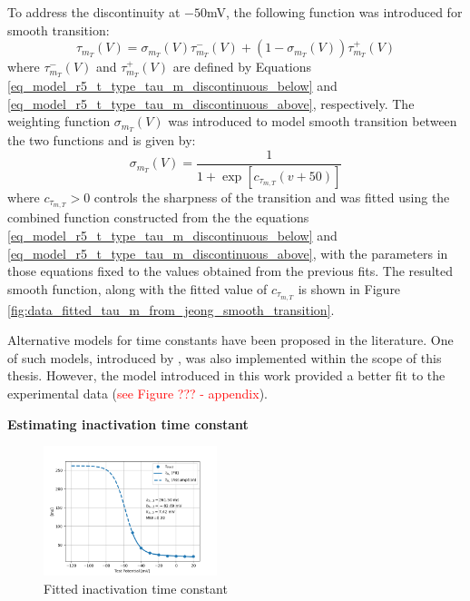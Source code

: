 \documentclass[../main.tex]{subfiles}
\begin{document}
To address the discontinuity at $-50$mV, the following function was introduced for smooth transition:
\begin{equation}\label{eq_model_r5_t_type_tau_m}
    \tau_{m_T}(V) = \sigma_{m_T}(V) \tau_{m_T}^-(V) + (1 - \sigma_{m_T}(V))\tau_{m_T}^+(V)
\end{equation}
where $\tau_{m_T}^-(V)$ and $\tau_{m_T}^+(V)$ are defined by Equations \ref{eq_model_r5_t_type_tau_m_discontinuous_below} and \ref{eq_model_r5_t_type_tau_m_discontinuous_above}, respectively. The weighting function $\sigma_{m_T}(V)$ was introduced to model smooth transition between the two functions and is given by:
\begin{equation}\label{eq_model_r5_t_type_channel_tau_m_sigma}
    \sigma_{m_T}(V) = \frac{1}{1 + \exp{[ c_{\tau_{m,T}} (v + 50) ]}}
\end{equation}
where $c_{\tau_{m,T}}>0$ controls the sharpness of the transition and was fitted using the combined function constructed from the the equations \ref{eq_model_r5_t_type_tau_m_discontinuous_below} and \ref{eq_model_r5_t_type_tau_m_discontinuous_above},  with the parameters in those equations fixed to the values obtained from the previous fits. The resulted smooth function, along with the fitted value of $c_{\tau_{m,T}}$ is shown in Figure \ref{fig:data_fitted_tau_m_from_jeong_smooth_transition}.

Alternative models for time constants have been proposed in the literature. One of such models, introduced by \parencite{destexheVivoVitroComputational1996}, was also implemented within the scope of this thesis. However, the model introduced in this work provided a better fit to the experimental data (\textcolor{red}{see Figure ??? - appendix}).

\vspace*{0.3cm}
\noindent\textbf{Estimating inactivation time constant}

\begin{figure}[!t]
    \centering
    \includegraphics[width=0.45\textwidth]{../../reports/workflow/img/t_type_calcium_channel/inactivation_tau_fit_2.png}
    \caption{Fitted inactivation time constant}
    \label{fig:data_fitted_taus_from_jeong_inactivation}
\end{figure}
\end{document}
